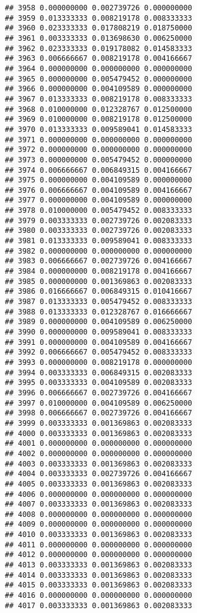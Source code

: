 \documentclass[
]{article}
\begin{document}
\begin{verbatim}
## 3958 0.000000000 0.002739726 0.000000000
## 3959 0.013333333 0.008219178 0.008333333
## 3960 0.023333333 0.017808219 0.018750000
## 3961 0.003333333 0.013698630 0.006250000
## 3962 0.023333333 0.019178082 0.014583333
## 3963 0.006666667 0.008219178 0.004166667
## 3964 0.000000000 0.000000000 0.000000000
## 3965 0.000000000 0.005479452 0.000000000
## 3966 0.000000000 0.004109589 0.000000000
## 3967 0.013333333 0.008219178 0.008333333
## 3968 0.010000000 0.012328767 0.012500000
## 3969 0.010000000 0.008219178 0.012500000
## 3970 0.013333333 0.009589041 0.014583333
## 3971 0.000000000 0.000000000 0.000000000
## 3972 0.000000000 0.000000000 0.000000000
## 3973 0.000000000 0.005479452 0.000000000
## 3974 0.006666667 0.006849315 0.004166667
## 3975 0.000000000 0.004109589 0.000000000
## 3976 0.006666667 0.004109589 0.004166667
## 3977 0.000000000 0.004109589 0.000000000
## 3978 0.010000000 0.005479452 0.008333333
## 3979 0.003333333 0.002739726 0.002083333
## 3980 0.003333333 0.002739726 0.002083333
## 3981 0.013333333 0.009589041 0.008333333
## 3982 0.000000000 0.000000000 0.000000000
## 3983 0.006666667 0.002739726 0.004166667
## 3984 0.000000000 0.008219178 0.004166667
## 3985 0.000000000 0.001369863 0.002083333
## 3986 0.016666667 0.006849315 0.010416667
## 3987 0.013333333 0.005479452 0.008333333
## 3988 0.013333333 0.012328767 0.016666667
## 3989 0.000000000 0.004109589 0.006250000
## 3990 0.000000000 0.009589041 0.008333333
## 3991 0.000000000 0.004109589 0.004166667
## 3992 0.006666667 0.005479452 0.008333333
## 3993 0.000000000 0.008219178 0.000000000
## 3994 0.003333333 0.006849315 0.002083333
## 3995 0.003333333 0.004109589 0.002083333
## 3996 0.006666667 0.002739726 0.004166667
## 3997 0.010000000 0.004109589 0.006250000
## 3998 0.006666667 0.002739726 0.004166667
## 3999 0.003333333 0.001369863 0.002083333
## 4000 0.003333333 0.001369863 0.002083333
## 4001 0.000000000 0.000000000 0.000000000
## 4002 0.000000000 0.000000000 0.000000000
## 4003 0.003333333 0.001369863 0.002083333
## 4004 0.003333333 0.002739726 0.004166667
## 4005 0.003333333 0.001369863 0.002083333
## 4006 0.000000000 0.000000000 0.000000000
## 4007 0.003333333 0.001369863 0.002083333
## 4008 0.000000000 0.000000000 0.000000000
## 4009 0.000000000 0.000000000 0.000000000
## 4010 0.003333333 0.001369863 0.002083333
## 4011 0.000000000 0.000000000 0.000000000
## 4012 0.000000000 0.000000000 0.000000000
## 4013 0.003333333 0.001369863 0.002083333
## 4014 0.003333333 0.001369863 0.002083333
## 4015 0.003333333 0.001369863 0.002083333
## 4016 0.000000000 0.000000000 0.000000000
## 4017 0.003333333 0.001369863 0.002083333

\end{verbatim}
\end{document}
